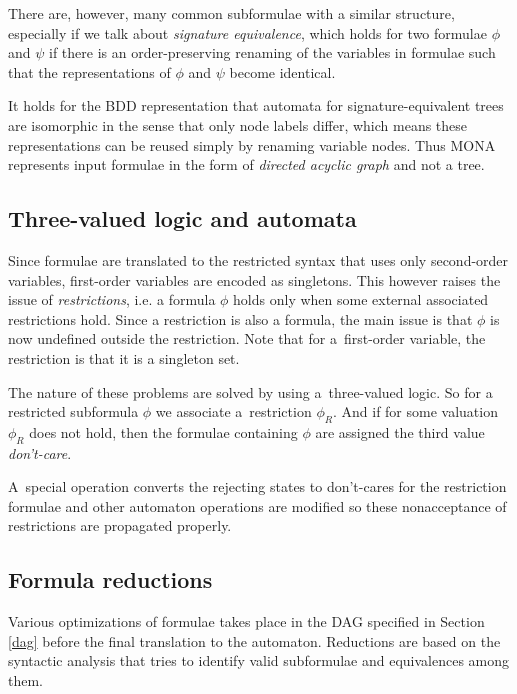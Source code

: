 There are, however, many common subformulae with a similar structure, especially
if we talk about \emph{signature equivalence}, which holds for two formulae $\phi$
and $\psi$ if there is an order-preserving renaming of the variables in formulae
such that the representations of $\phi$ and $\psi$ become identical.

It holds for the BDD representation that automata for signature-equivalent trees
are isomorphic in the sense that only node labels differ, which means these
representations can be reused simply by renaming variable nodes. Thus MONA
represents input formulae in the form of \emph{directed acyclic graph} and not a
tree.

\subsection{Three-valued logic and automata}
Since formulae are translated to the restricted syntax that uses only
second-order variables, first-order variables are encoded as singletons. This
however raises the issue of \emph{restrictions}, i.e. a formula $\phi$ holds
only when some external associated restrictions hold. Since a restriction is
also a formula, the main issue is that $\phi$ is now undefined outside the
restriction. Note that for a~first-order variable, the restriction is that it is
a singleton set.

The nature of these problems are solved by using a~three-valued logic. So for a
restricted subformula $\phi$ we associate a~restriction $\phi_R$. And if for
some valuation $\phi_R$ does not hold, then the formulae containing $\phi$ are
assigned the third value \emph{don't-care}.

A~special operation converts the rejecting states to don't-cares for the
restriction formulae and other automaton operations are modified so these
nonacceptance of restrictions are propagated properly.

\subsection{Formula reductions}
Various optimizations of formulae takes place in the DAG specified in Section
\ref{dag} before the final translation to the automaton. Reductions are based on
the syntactic analysis that tries to identify valid subformulae and equivalences
among them.

